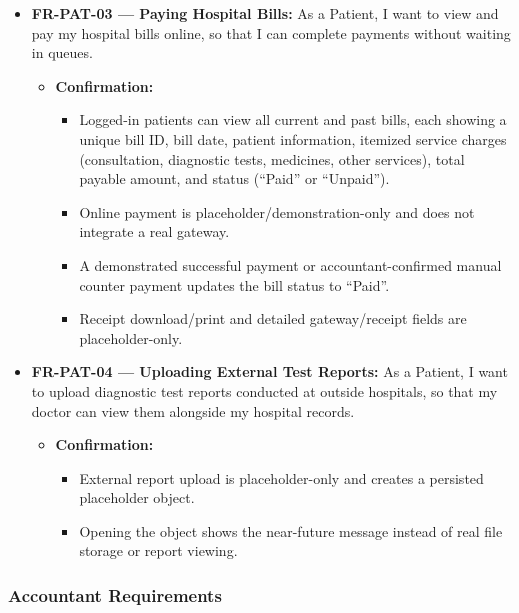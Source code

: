 \documentclass[11pt,a4paper]{article}
\begin{document}
\begin{itemize}
    \item \textbf{FR-PAT-03 — Paying Hospital Bills:} As a Patient, I want to view and pay my hospital bills online, so that I can complete payments without waiting in queues.
    \begin{itemize}
        \item \textbf{Confirmation:}
        \begin{itemize}
            \item Logged-in patients can view all current and past bills, each showing a unique bill ID, bill date, patient information, itemized service charges (consultation, diagnostic tests, medicines, other services), total payable amount, and status (``Paid'' or ``Unpaid'').
            \item Online payment is placeholder/demonstration-only and does not integrate a real gateway.
            \item A demonstrated successful payment or accountant-confirmed manual counter payment updates the bill status to ``Paid''.
            \item Receipt download/print and detailed gateway/receipt fields are placeholder-only.
        \end{itemize}
    \end{itemize}

    \item \textbf{FR-PAT-04 — Uploading External Test Reports:} As a Patient, I want to upload diagnostic test reports conducted at outside hospitals, so that my doctor can view them alongside my hospital records.
    \begin{itemize}
        \item \textbf{Confirmation:}
        \begin{itemize}
            \item External report upload is placeholder-only and creates a persisted placeholder object.
            \item Opening the object shows the near-future message instead of real file storage or report viewing.
        \end{itemize}
    \end{itemize}
\end{itemize}

\subsubsection{Accountant Requirements}
\end{document}
